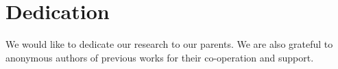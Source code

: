 \documentclass{standalone}
\begin{document}
\chapter*{Dedication}
We would like to dedicate our research to our parents. We are also grateful to anonymous authors of
previous works for their co-operation and support.
\end{document}
